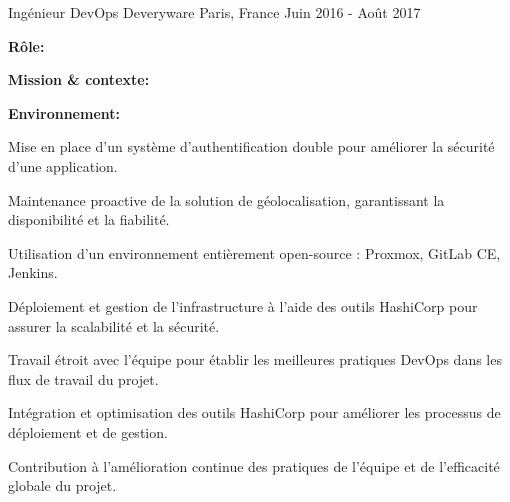 \begin{cventries}
\cventry
{Ingénieur DevOps} %
{Deveryware} %
{Paris, France} %
{Juin 2016 - Août 2017} %
{
  \begin{cvitems} %
    \item {\textbf{Rôle:} }
    \item {\textbf{Mission \& contexte:} }
    \item {\textbf{Environnement:} }
    \item {Mise en place d'un système d'authentification double pour améliorer la sécurité d'une application.}
    \item {Maintenance proactive de la solution de géolocalisation, garantissant la disponibilité et la fiabilité.}
    \item {Utilisation d'un environnement entièrement open-source : Proxmox, GitLab CE, Jenkins.}
    \item {Déploiement et gestion de l'infrastructure à l'aide des outils HashiCorp pour assurer la scalabilité et la sécurité.}
    \item {Travail étroit avec l'équipe pour établir les meilleures pratiques DevOps dans les flux de travail du projet.}
    \item {Intégration et optimisation des outils HashiCorp pour améliorer les processus de déploiement et de gestion.}
    \item {Contribution à l'amélioration continue des pratiques de l'équipe et de l'efficacité globale du projet.}
  \end{cvitems}
}


\end{cventries}
